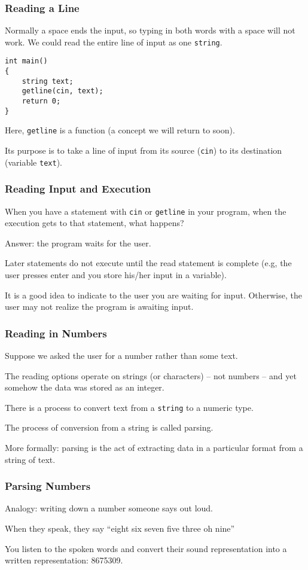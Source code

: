 \begin{frame}[fragile]
\frametitle{Reading a Line}

Normally a space ends the input, so typing in both words with a space will not work.
We could read the entire line of input as one \texttt{string}.

\begin{verbatim}
int main()
{
    string text;
    getline(cin, text);
    return 0;
}
\end{verbatim}

Here, \texttt{getline} is a function (a concept we will return to soon).

Its purpose is to take a line of input from its source (\texttt{cin}) to its destination (variable \texttt{text}).

\end{frame}


\begin{frame}
\frametitle{Reading Input and Execution}
When you have a statement with \texttt{cin} or \texttt{getline} in your program, when the execution gets to that statement, what happens?

Answer: the program waits for the user.

Later statements do not execute until the read statement is complete (e.g, the user presses enter and you store his/her input in a variable).

It is a good idea to indicate to the user you are waiting for input. Otherwise, the user may not realize the program is awaiting input.

\end{frame}

\begin{frame}
\frametitle{Reading in Numbers}
Suppose we asked the user for a number rather than some text.

The reading options operate on strings (or characters) -- not numbers -- and yet somehow the data was stored as an integer.

There is a process to convert text from a \texttt{string} to a numeric type.

The process of conversion from a string is called \alert{parsing}.

More formally: parsing is the act of extracting data in a particular format from a string of text.

\end{frame}

\begin{frame}
\frametitle{Parsing Numbers}



Analogy: writing down a number someone says out loud.

When they speak, they say ``eight six seven five three oh nine''

You listen to the spoken words and convert their sound representation into a written representation: 8675309.

\end{frame}

